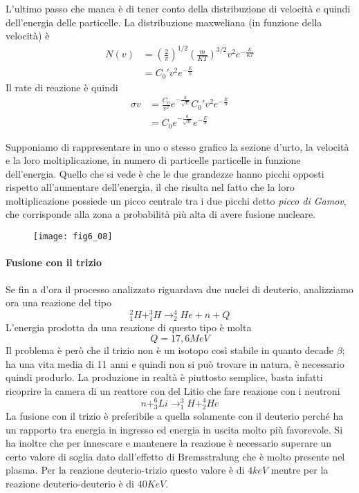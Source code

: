 L'ultimo passo che manca è di tener conto della distribuzione di velocità e quindi dell'energia delle particelle.
La distribuzione maxweliana (in funzione della velocità) è
\begin{equation}
\begin{split}
N(v)&=\left(\frac{2}{\pi}\right)^{1/2}\left(\frac{m}{KT}\right)^{3/2}v^2e^{-\frac{E}{KT}}\\
&=C_0'v^2e^{-\frac{E}{b}}
\end{split}
\end{equation}
Il rate di reazione è quindi 
\begin{equation}
\begin{split}
\sigma v&=\frac{C_0}{v^2}e^{-\frac{a}{\sqrt{E}}}C_0' v^2e^{-\frac{E}{b}}\\
&=C_0 e^{-\frac{a}{\sqrt{E}}}e^{-\frac{E}{b}}
\end{split}
\end{equation}

Supponiamo di rappresentare in uno o stesso grafico la sezione d'urto, la velocità e la loro moltiplicazione, in numero di particelle particelle in funzione  dell'energia.
Quello che si vede è che le due grandezze hanno picchi opposti rispetto all'aumentare dell'energia, il che risulta nel fatto che la loro moltiplicazione possiede un picco centrale tra i due picchi detto \emph{picco di Gamov}, che corrisponde alla zona a probabilità più alta di avere fusione nucleare.
\begin{figure}[h]
\centering
\texttt{[image: fig6\_08]}
\end{figure}

\paragraph{Fusione con il trizio}
Se fin a d'ora il processo analizzato riguardava due nuclei di deuterio, analizziamo ora una reazione del tipo
\begin{equation}
^2_1H+^3_1H\longrightarrow ^4_2He+n+Q
\end{equation}
L'energia prodotta da una reazione di questo tipo è molta
\begin{equation}
Q=17,6MeV
\end{equation}
Il problema è però che il trizio non è un isotopo così stabile in quanto decade $\beta$; 
ha una vita media di 11 anni e quindi non si può trovare in natura, è necessario quindi produrlo.
La produzione in realtà è piuttosto semplice, basta infatti ricoprire la camera di un reattore con del Litio che fare reazione con i neutroni
\begin{equation}
n+^6_3Li\longrightarrow ^3_1H+^4_2He
\end{equation}
La fusione con il trizio è preferibile a quella solamente con il deuterio perché ha un rapporto tra energia in ingresso ed energia in uscita molto più favorevole.
Si ha inoltre che per innescare e mantenere la reazione è necessario superare un certo valore di soglia dato dall'effetto di Bremsstralung che è molto presente nel plasma.
Per la reazione deuterio-trizio questo valore è di $4keV$ mentre per la reazione deuterio-deuterio è di $40KeV$.

